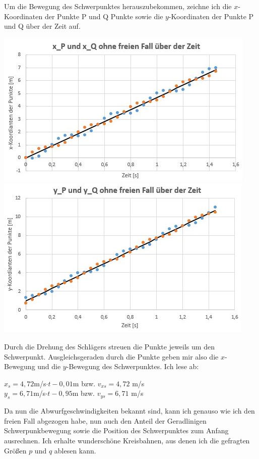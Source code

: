 \documentclass{article}
\begin{document}
Um die Bewegung des Schwerpunktes herauszubekommen, zeichne ich die $x$-Koordinaten der Punkte P und Q Punkte sowie die $y$-Koordinaten der Punkte P und Q über der Zeit auf. 
\begin{center}
	\includegraphics[scale=0.47]{x_s-ueber-Zeit.JPG}
	\includegraphics[scale=0.45]{y_s-ueber-Zeit.JPG}
\end{center}
Durch die Drehung des Schlägers streuen die Punkte jeweils um den Schwerpunkt. Ausgleichsgeraden durch die Punkte geben mir also die $x$-Bewegung und die $y$-Bewegung des Schwerpunktes.
Ich lese ab:
\begin{center}
	$x_s=4,72$m/s$\cdot t -0,01$m bzw. $ v_{xs} = 4,72$ m/s \\
	$y_s=6,71$m/s$\cdot t -0,95$m bzw. $ v_{ys} = 6,71$ m/s \\
\end{center}
Da nun die Abwurfgeschwindigkeiten bekannt sind, kann ich genauso wie ich den freien Fall abgezogen habe, nun auch den Anteil der Geradlinigen Schwerpunkbewegung sowie die Position des Schwerpunktes zum Anfang ausrechnen.
Ich erhalte wunderschöne Kreisbahnen, aus denen ich die gefragten Größen $p$ und $q$ ablesen kann. 
\end{document}
